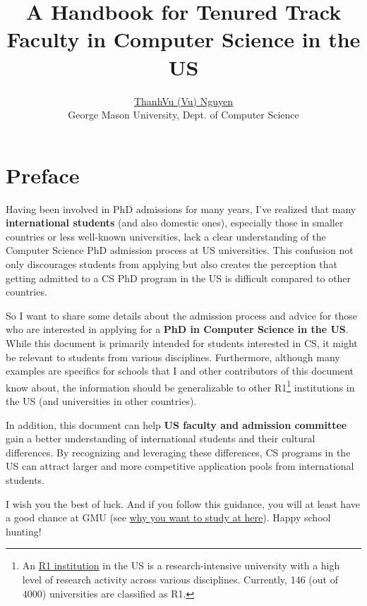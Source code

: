 \documentclass[oneside,11pt]{memoir}
\title{A Handbook for Tenured Track Faculty in Computer Science in the US}
\author{\href{https://nguyenthanhvuh.github.io}{ThanhVu (Vu) Nguyen}\\{\small George Mason University, Dept. of Computer Science}}
\makeatletter
\def\maketitle{%
  \null
  \thispagestyle{empty}%
  \vfill
  \begin{center}\leavevmode
    \normalfont
    {\LARGE\raggedright \textbf{\@title}\par}%
    \vfill%
    {\Large \@author\par}%
    \vfill%
    {\large\raggedleft \@date\par}%
  \end{center}%
  \vfill
  \null
  \cleardoublepage
}
\makeatother
\begin{document}
\maketitle
\frontmatter

\chapter{Preface}
Having been involved in PhD admissions for many years, I've
realized that many \textbf{international students} (and also domestic ones), especially those in  smaller countries or less well-known universities, lack a clear understanding of
the Computer Science PhD admission process at US universities. This confusion not only
discourages students from applying but also creates the perception that
getting admitted to a CS PhD program in the US is difficult compared to other countries.

So I want to share some details about the admission process and advice for those who are interested in applying for a \textbf{PhD in Computer Science in the US}.
While this document is primarily intended for students interested in CS, it might be relevant to students from various disciplines.
Furthermore, although many examples are specifics for schools that I and other contributors of this document know about, the information should be generalizable to other R1\footnote{An \href{https://en.wikipedia.org/wiki/List_of_research_universities_in_the_United_States}{R1 institution} in the US is a research-intensive university with a high level of research activity across various disciplines. Currently, 146 (out of 4000) universities are classified as R1.} institutions in the US (and universities in other countries).

In addition, this document can help \textbf{US faculty and admission committee} gain a better understanding of international students and their cultural differences.  By recognizing and leveraging these differences, CS programs in the US can attract larger and more competitive application pools from international students.

I wish you the best of luck. And if you follow this guidance, you will at least have a good chance at GMU (see
\href{https://github.com/dynaroars/dynaroars.github.io/wiki/About-GMU}{why
  you want to study at here}). Happy school hunting!
\end{document}
